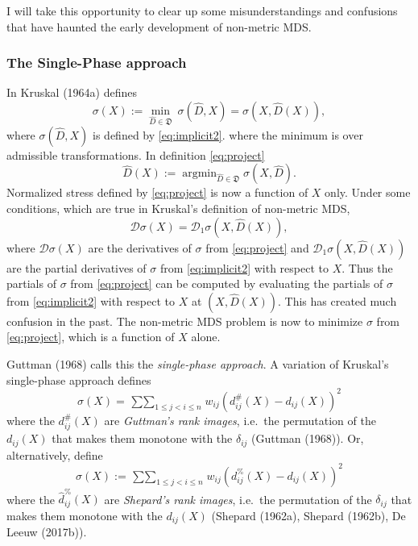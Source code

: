 \documentclass[
  12pt,
]{article}
\newcommand{\jis}{\mathop{\sum\sum}_{1\leq j<i\leq n}}
\begin{document}
I will take this opportunity to clear up some misunderstandings and confusions
that have haunted the early development of non-metric MDS.

\subsubsection{The Single-Phase approach}\label{the-single-phase-approach}

In Kruskal (1964a) defines
\begin{equation}
\sigma(X):=\min_{\hat D\in\mathfrak{D}}\ \sigma(\hat D,X)=\sigma(X,\hat D(X)),
\label{eq:project}
\end{equation}
where \(\sigma(\hat D,X)\) is defined by \eqref{eq:implicit2}.
where the minimum is over admissible transformations. In definition
\eqref{eq:project}
\begin{equation}
\hat D(X):=\mathop{\text{argmin}}_{\hat D\in\mathfrak{D}}\sigma(X, \hat D).
\label{eq:optscal}
\end{equation}
Normalized stress defined by \eqref{eq:project} is now a function of \(X\) only. Under some
conditions, which are true in Kruskal's definition of non-metric MDS,
\begin{equation}
\mathcal{D}\sigma(X)=\mathcal{D}_1\sigma(X,\hat D(X)),
\label{eq:partials}
\end{equation}
where \(\mathcal{D}\sigma(X)\) are the derivatives of \(\sigma\) from \eqref{eq:project} and \(\mathcal{D}_1\sigma(X,\hat D(X))\) are the partial derivatives of \(\sigma\) from \eqref{eq:implicit2} with respect to \(X\). Thus the partials of \(\sigma\) from \eqref{eq:project} can be computed by evaluating the partials of \(\sigma\) from \eqref{eq:implicit2} with respect to \(X\) at \((X,\hat D(X))\). This has created much confusion in the past. The non-metric MDS problem is now to minimize \(\sigma\) from \eqref{eq:project}, which is a function of \(X\) alone.

Guttman (1968) calls this the \emph{single-phase approach}. A variation of
Kruskal's single-phase approach defines
\[
\sigma(X)=\jis w_{ij}(d_{ij}^\#(X)-d_{ij}(X))^2
\]
where the \(d_{ij}^\#(X)\) are \emph{Guttman's rank images}, i.e.~the
permutation of the \(d_{ij}(X)\) that makes them monotone with the
\(\delta_{ij}\) (Guttman (1968)). Or, alternatively, define
\[
\sigma(X):=\jis w_{ij}(d_{ij}^\%(X)-d_{ij}(X))^2
\]
where the \(\hat d_{ij}^\%(X)\) are \emph{Shepard's rank images}, i.e.~the
permutation of the \(\delta_{ij}\) that makes them monotone with the
\(d_{ij}(X)\) (Shepard (1962a), Shepard (1962b), De Leeuw (2017b)).
\end{document}
